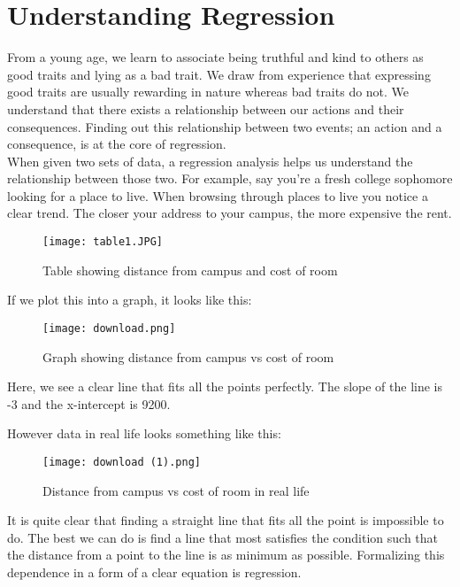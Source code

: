 \documentclass{article}
\begin{document}
\newpage
\section{Understanding Regression}

From a young age, we learn to associate being truthful and kind to others as good traits and lying as a bad trait. We draw from experience that expressing good traits are usually rewarding in nature whereas bad traits do not. We understand that there exists a relationship between our actions and their consequences. Finding out this relationship between two events; an action and a consequence, is at the core of regression.\\

When given two sets of data, a regression analysis helps us understand the relationship between those two. For example, say you're a fresh college sophomore looking for a place to live. When browsing through places to live you notice a clear trend. The closer your address to your campus, the more expensive the rent.

\begin{figure}[h]
\texttt{[image: table1.JPG]}
\centering
\caption{Table showing distance from campus and cost of room}
\end{figure}

If we plot this into a graph, it looks like this:

\begin{figure}[h]
\texttt{[image: download.png]}
\centering
\caption{Graph showing distance from campus vs cost of room}
\end{figure}

Here, we see a clear line that fits all the points perfectly. The slope of the line is -3 and the x-intercept is 9200.

\newpage
However data in real life looks something like this:

\begin{figure}[h]
\texttt{[image: download (1).png]}
\centering
\caption{Distance from campus vs cost of room in real life}
\end{figure}

It is quite clear that finding a straight line that fits all the point is impossible to do. The best we can do is find a line that most satisfies the condition such that the distance from a point to the line is as minimum as possible. Formalizing this dependence in a form of a clear equation is regression.\\
\end{document}
